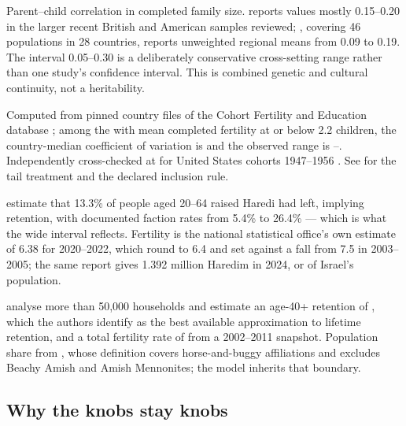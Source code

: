 \begin{description}[leftmargin=1.2em,style=nextline,itemsep=0.35em]
\item[mainstream persistence] Parent--child correlation in completed family size.
\citet{murphy1999} reports values mostly 0.15--0.20 in the larger recent British
and American samples reviewed; \citet{murphy2013}, covering 46 populations in 28
countries, reports unweighted regional means from 0.09 to 0.19. The interval
0.05--0.30 is a deliberately conservative cross-setting range rather than one
study's confidence interval. This is combined genetic and cultural continuity,
not a heritability.

\item[mainstream propensity cv] Computed from \CVAllCountries{} pinned country
files of the Cohort Fertility and Education database \citep{cfe2017}; among the
\CVCountries{} with mean completed fertility at or below 2.2 children, the
country-median coefficient of variation is \CVMedian{} and the observed range is
\CVMin{}--\CVMax{}. Independently cross-checked at \CVUnitedStates{} for United
States cohorts 1947--1956 \citep{cdccohort}. See  for the tail
treatment and the declared inclusion rule.

\item[group retention/fertility/share, haredi] \citet{regev2020} estimate that
13.3\% of people aged 20--64 raised Haredi had left, implying \HarediRetention{}
retention, with documented faction rates from 5.4\% to 26.4\% --- which is what
the wide interval reflects. Fertility \HarediFertility{} is the national
statistical office's own estimate of 6.38 for 2020--2022, which \citet{idi2024}
round to 6.4 and set against a fall from 7.5 in 2003--2005; the same report gives
1.392 million Haredim in 2024, or \HarediShare{} of Israel's population.

\item[group retention/fertility/share, amish] \citet{anderson2025} analyse more
than 50{,}000 households and estimate an age-40+ retention of \AmishRetention{},
which the authors identify as the best available approximation to lifetime
retention, and a total fertility rate of \AmishFertility{} from a 2002--2011
snapshot. Population share \AmishShare{} from \citet{youngcenter2024}, whose
definition covers horse-and-buggy affiliations and excludes Beachy Amish and
Amish Mennonites; the model inherits that boundary.
\end{description}

\subsection*{Why the knobs stay knobs}


